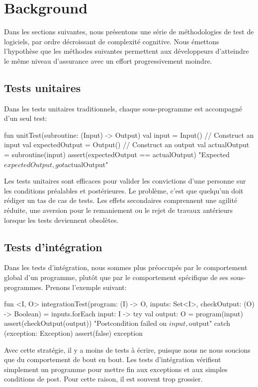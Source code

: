 \section{Background}

Dans les sections suivantes, nous présentons une série de méthodologies de test de logiciels, par ordre décroissant de complexité cognitive. Nous émettons l'hypothèse que les méthodes suivantes permettent aux développeurs d'atteindre le même niveau d'assurance avec un effort progressivement moindre.

\subsection{Tests unitaires}

\noindent Dans les tests unitaires traditionnels, chaque sous-programme est accompagné d'un seul test:
%
\begin{kotlinlisting}
fun unitTest(subroutine: (Input) -> Output) {
    val input = Input() // Construct an input
    val expectedOutput = Output() // Construct an output
    val actualOutput = subroutine(input)
    assert(expectedOutput == actualOutput) { "Expected $expectedOutput, got $actualOutput" }
}
\end{kotlinlisting}
%
Les tests unitaires sont efficaces pour valider les convictions d'une personne sur les conditions préalables et postérieures. Le problème, c'est que quelqu'un doit rédiger un tas de cas de tests. Les effets secondaires comprennent une agilité réduite, une aversion pour le remaniement ou le rejet de travaux antérieurs lorsque les tests deviennent obsolètes.

\subsection{Tests d'intégration}

\noindent Dans les tests d'intégration, nous sommes plus préoccupés par le comportement global d'un programme, plutôt que par le comportement spécifique de ses sous-programmes. Prenons l'exemple suivant:

\begin{kotlinlisting}
fun <I, O> integrationTest(program: (I) -> O, inputs: Set<I>, checkOutput: (O) -> Boolean) =
    inputs.forEach { input: I ->
        try {
            val output: O = program(input)
            assert(checkOutput(output)) { "Postcondition failed on $input, $output" }
        } catch (exception: Exception) {
            assert(false) { exception }
        }
    }
\end{kotlinlisting}
%
Avec cette stratégie, il y a moins de tests à écrire, puisque nous ne nous soucions que du comportement de bout en bout. Les tests d'intégration vérifient simplement un programme pour mettre fin aux exceptions et aux simples conditions de post. Pour cette raison, il est souvent trop grossier.

